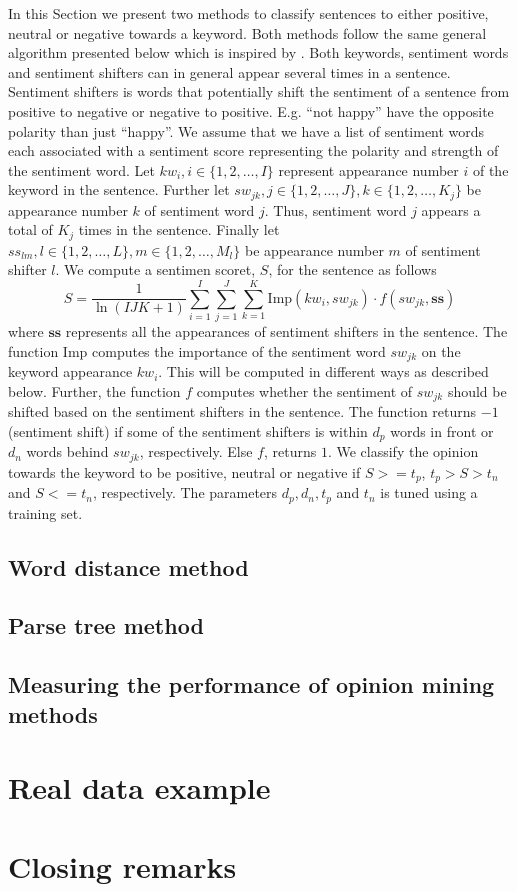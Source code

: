 \documentclass[a4paper, 12pt]{article}
\begin{document}
In this Section we present two methods to classify sentences to either positive, neutral or negative towards a keyword. Both methods follow the same general algorithm presented below which is inspired by  \citet{Ding08}. Both keywords, sentiment words and sentiment shifters can in general appear several times in a sentence. Sentiment shifters is words that potentially shift the sentiment of a sentence from positive to negative or negative to positive. E.g. ``not happy'' have the opposite polarity than just ``happy''. We assume that we have a list of sentiment words each associated with a sentiment score representing the polarity and strength of the sentiment word. Let $kw_i, i \in \{1,2,\ldots,I\}$ represent appearance number $i$ of the keyword in the sentence. Further let $sw_{jk}, j \in \{1,2,\ldots,J\}, k \in\{1,2,\ldots,K_j\}$ be appearance number $k$ of sentiment word $j$. Thus, sentiment word $j$ appears a total of $K_j$ times in the sentence. Finally let $ss_{lm}, l \in \{1,2,\ldots,L\}, m \in\{1,2,\ldots,M_l\}$ be appearance number $m$ of sentiment shifter $l$. We compute a sentimen scoret, $S$, for the sentence as follows
\begin{equation}
  \label{eq:1}
  S = \frac{1}{\ln{(IJK+1)}} \sum_{i=1}^{I} \sum_{j=1}^{J} \sum_{k=1}^{K} \text{Imp}(kw_i, sw_{jk})\cdot f(sw_{jk}, \mathbf{ss})
\end{equation}
where $\mathbf{ss}$ represents all the appearances of sentiment shifters in the sentence. The function Imp computes the importance of the sentiment word $sw_{jk}$ on the keyword appearance $kw_i$. This will be computed in different ways as described below. Further, the function $f$ computes whether the sentiment of $sw_{jk}$ should be shifted based on the sentiment shifters in the sentence. The function returns $-1$ (sentiment shift) if some of the sentiment shifters is within $d_{p}$ words in front or $d_{n}$ words behind $sw_{jk}$, respectively. Else $f$, returns $1$. We classify the opinion towards the keyword to be positive, neutral or negative if $S >= t_p$,  $t_p > S > t_n$ and  $S <= t_n$, respectively. The parameters $d_p, d_n, t_p$ and $t_n$ is tuned using a training set.

\subsection{Word distance method}
\label{sec:wd}

\subsection{Parse tree method}
\label{sec:dp}

\subsection{Measuring the performance of opinion mining methods}
\label{sec:diff}

\section{Real data example}
\label{sec:results}

\section{Closing remarks}
\label{sec:cr}


\end{document}
